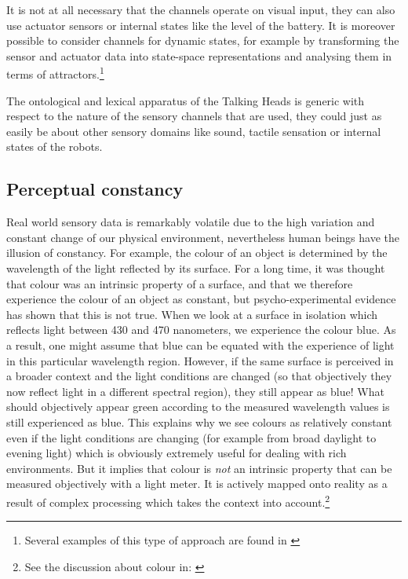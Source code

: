 It is not at all necessary that the channels operate 
on visual input, they can also use actuator sensors or internal states
like the level of the battery. It is moreover possible to 
consider channels for dynamic states, for 
example by transforming the sensor and actuator
data into state-space representations and 
analysing them in terms of attractors.\footnote{
Several examples of this type of approach are 
found in \cite{Port:1995}}

The ontological and lexical apparatus of the Talking Heads is 
generic with respect to the nature of the sensory channels
that are used, they could just as easily be about other sensory 
domains like sound, tactile sensation or internal states
of the robots.

\subsection{Perceptual constancy}

Real world sensory data is remarkably volatile due to the 
high variation and constant change of 
our physical environment, nevertheless human beings have 
the illusion of constancy. 
For example, the colour of an object is determined 
by the wavelength of the light reflected by its surface. 
For a long time, it 
was thought that colour was an intrinsic property of a 
surface, and that we therefore experience the colour of 
an object as constant, but psycho-experimental evidence has shown 
that this is not true. When we look at a surface in 
isolation which reflects light between 
430 and 470 nanometers, we experience 
the colour blue. As a result, one might assume
that blue can be equated
with the experience of light in this particular wavelength 
region. However, if the same surface is perceived
in a broader context and the light conditions 
are changed (so that objectively they now 
reflect light in a different spectral region), they still 
appear as blue! What should objectively 
appear green according to the measured wavelength 
values is still experienced
as blue. This explains why we see colours
as relatively constant even if the light conditions
are changing (for example from broad daylight to 
evening light) which is obviously extremely useful 
for dealing with rich environments. But it 
implies that colour is {\itshape not}
an intrinsic property that can be measured objectively 
with a light meter. It is actively mapped onto reality 
as a result of complex processing which takes the 
context into account.\footnote{
See the discussion about colour 
in: \cite{Varela:1991}}

